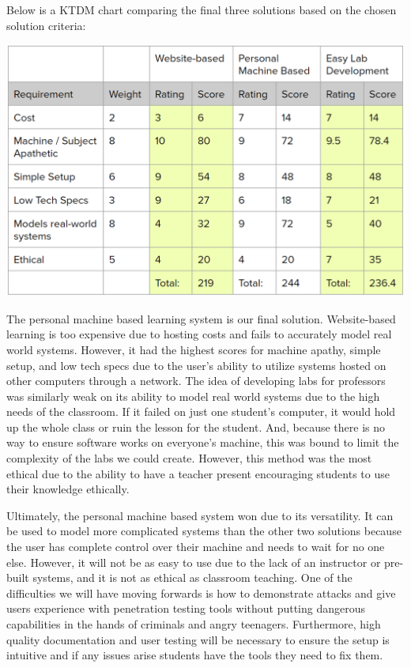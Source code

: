 \documentclass[openright]{report}
\begin{document}
\par Below is a KTDM chart comparing the final three solutions based on the chosen solution criteria: 

\begin{center}
    \includegraphics[scale=0.9]{images/IdeaComparison.PNG}
\end{center}

\par The personal machine based learning system is our final solution. Website-based learning is too expensive due to hosting costs and fails to accurately model real world systems. However, it had the highest scores for machine apathy, simple setup, and low tech specs due to the user's ability to utilize systems hosted on other computers through a network. The idea of developing labs for professors was similarly weak on its ability to model real world systems due to the high needs of the classroom. If it failed on just one student's computer, it would hold up the whole class or ruin the lesson for the student. And, because there is no way to ensure software works on everyone's machine, this was bound to limit the complexity of the labs we could create\cite{ibrahiminterview}. However, this method was the most ethical due to the ability to have a teacher present encouraging students to use their knowledge ethically. 

\par Ultimately, the personal machine based system won due to its versatility. It can be used to model more complicated systems than the other two solutions because the user has complete control over their machine and needs to wait for no one else. However, it will not be as easy to use due to the lack of an instructor or pre-built systems, and it is not as ethical as classroom teaching. One of the difficulties we will have moving forwards is how to demonstrate attacks and give users experience with penetration testing tools without putting dangerous capabilities in the hands of criminals and angry teenagers. Furthermore, high quality documentation and user testing will be necessary to ensure the setup is intuitive and if any issues arise students have the tools they need to fix them.
\end{document}
